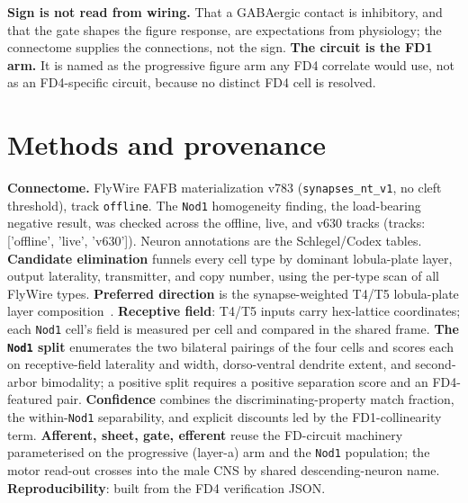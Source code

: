 \documentclass[11pt]{article}
\newcommand{\ttt}[1]{\texttt{#1}}
\begin{document}
\textbf{Sign is not read from wiring.} That a GABAergic contact is inhibitory, and that the gate shapes the figure response, are expectations from physiology; the connectome supplies the connections, not the sign. \textbf{The circuit is the FD1 arm.} It is named as the progressive figure arm any FD4 correlate would use, not as an FD4-specific circuit, because no distinct FD4 cell is resolved.

\section{Methods and provenance}

\textbf{Connectome.} FlyWire FAFB materialization v783 (\ttt{synapses\_nt\_v1}, no cleft threshold), track \ttt{offline}. The \ttt{Nod1} homogeneity finding, the load-bearing negative result, was checked across the offline, live, and v630 tracks (tracks: ['offline', 'live', 'v630']). Neuron annotations are the Schlegel/Codex tables. \textbf{Candidate elimination} funnels every cell type by dominant lobula-plate layer, output laterality, transmitter, and copy number, using the per-type scan of all FlyWire types. \textbf{Preferred direction} is the synapse-weighted T4/T5 lobula-plate layer composition~\cite{fd1989,maisak2013}. \textbf{Receptive field}: T4/T5 inputs carry hex-lattice coordinates; each \ttt{Nod1} cell's field is measured per cell and compared in the shared frame. \textbf{The \ttt{Nod1} split} enumerates the two bilateral pairings of the four cells and scores each on receptive-field laterality and width, dorso-ventral dendrite extent, and second-arbor bimodality; a positive split requires a positive separation score and an FD4-featured pair. \textbf{Confidence} combines the discriminating-property match fraction, the within-\ttt{Nod1} separability, and explicit discounts led by the FD1-collinearity term. \textbf{Afferent, sheet, gate, efferent} reuse the FD-circuit machinery parameterised on the progressive (layer-a) arm and the \ttt{Nod1} population; the motor read-out crosses into the male CNS by shared descending-neuron name. \textbf{Reproducibility}: built from the FD4 verification JSON.

\clearpage
\end{document}
